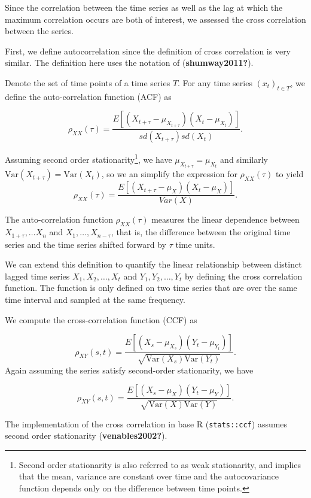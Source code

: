 \documentclass[12pt,twoside]{smiththesis}
\begin{document}
Since the correlation between the time series as well as the lag at which the maximum correlation occurs are both of interest, we assessed the cross correlation between the series.

First, we define autocorrelation since the definition of cross correlation is very similar. The definition here uses the notation of (\textbf{shumway2011?}).
\begin{tcolorbox}[title=Definition: Autocorrelation]

Denote the set of time points of a time series $T$. For any time series $(x_t)_{t\in T}$, we define the auto-correlation function (ACF)  as 

$$\rho_{XX}(\tau) = \dfrac{E[(X_{t + \tau} - \mu_{X_{t+\tau}}) (X_t - \mu_{X_t})]}{sd(X_{t+\tau}) sd(X_t)}.$$
\end{tcolorbox}
Assuming second order stationarity\footnote{Second order stationarity is also referred to as weak stationarity, and implies that the mean, variance are constant over time and the autocovariance function depends only on the difference between time points.}, we have \(\mu_{X_{t+\tau}}=\mu_{X_{t}}\)
and similarly \(\text{Var}({X_{t+\tau}})=\text{Var}({X_{t}})\), so we an simplify the expression for \(\rho_{XX} (\tau)\) to yield\\
\[\rho_{XX} (\tau)=\dfrac{E[(X_{t + \tau} - \mu_{X}) (X_t - \mu_{X})]}{Var(X)}.\]

The auto-correlation function \(\rho_{XX}(\tau)\) measures the linear dependence between \(X_{1+\tau}, \dots X_n\) and \(X_1, \dots, X_{n-\tau}\), that is, the difference between the original time series and the time series shifted forward by \(\tau\) time units.

We can extend this definition to quantify the linear relationship between distinct lagged time series \(X_1, X_2, \dots, X_t\) and \(Y_1, Y_2, \dots, Y_t\) by defining the cross correlation function. The function is only defined on two time series that are over the same time interval and sampled at the same frequency.
\begin{tcolorbox}[title=Definition: Cross-Correlation]

We compute the cross-correlation function (CCF) as

$$\rho_{XY}(s,t) = \dfrac{E[(X_s - \mu_{X_s})(Y_t-\mu_{Y_t})]}{\sqrt{\text{Var}(X_s) \text{Var}(Y_t)}}.$$
Again assuming the series satisfy second-order stationarity, we have

$$\rho_{XY}(s,t) = \dfrac{E[(X_s - \mu_{X})(Y_t-\mu_{Y})]}{\sqrt{\text{Var}(X) \text{Var}(Y)}}.$$

\end{tcolorbox}
The implementation of the cross correlation in base R (\texttt{stats::ccf}) assumes second order stationarity (\textbf{venables2002?}).
\end{document}
